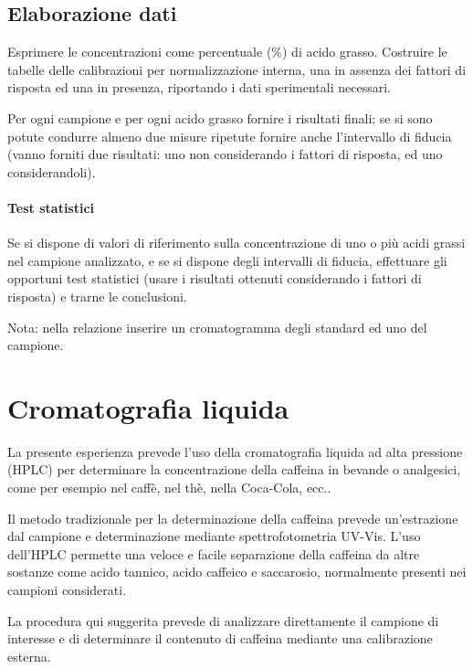 \subsection{Elaborazione dati}
Esprimere le concentrazioni come percentuale (\%) di acido grasso. Costruire le tabelle delle calibrazioni per normalizzazione interna, una in assenza dei fattori di risposta ed una in presenza, riportando i dati sperimentali necessari.

Per ogni campione e per ogni acido grasso fornire i risultati finali; se si sono potute condurre almeno due misure ripetute fornire anche l'intervallo di fiducia (vanno forniti due risultati: uno non considerando i fattori di risposta, ed uno considerandoli).

\paragraph{Test statistici}
Se si dispone di valori di riferimento sulla concentrazione di uno o più acidi grassi nel campione analizzato, e se si dispone degli intervalli di fiducia, effettuare gli opportuni test statistici (usare i risultati ottenuti considerando i fattori di risposta) e trarne le conclusioni.

Nota: nella relazione inserire un cromatogramma degli standard ed uno del campione.

\section{Cromatografia liquida}

La presente esperienza prevede l'uso della cromatografia liquida ad alta pressione (HPLC) per determinare la concentrazione della caffeina in bevande o analgesici, come per esempio nel caffè, nel thè, nella Coca-Cola, ecc..


Il metodo tradizionale per la determinazione della caffeina prevede un'estrazione dal campione e determinazione mediante spettrofotometria UV-Vis. L'uso dell'HPLC permette una veloce e facile separazione della caffeina da altre sostanze come acido tannico, acido caffeico e saccarosio, normalmente presenti nei campioni considerati.

La procedura qui suggerita prevede di analizzare direttamente il campione di interesse e di determinare il contenuto di caffeina mediante una calibrazione esterna.

